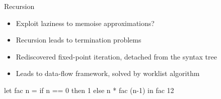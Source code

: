 \documentclass{haskellbeamer}
\begin{document}
\begin{frame}[fragile]{Recursion}
  \begin{itemize}
    \item Exploit laziness to memoise approximations?
    \item[\xmark] Recursion leads to termination problems
    \item Rediscovered fixed-point iteration, detached from the syntax tree
    \item Leads to data-flow framework, solved by worklist algorithm
  \end{itemize}
  \begin{center}
    \begin{minipage}{0.5\textwidth}
      \begin{haskell}
        let fac n = 
              if n == 0
                then 1
                else n * fac (n-1)
        in fac 12
      \end{haskell}
    \end{minipage}
  \end{center}
\end{frame}
\end{document}

